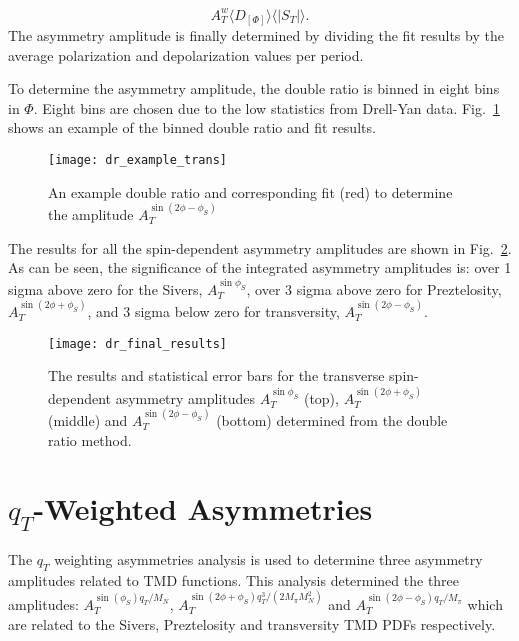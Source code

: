 \begin{equation}
  A^w_T \langle D_{[\Phi]} \rangle \langle |S_T|\rangle.
\end{equation}
\noindent
The asymmetry amplitude is finally determined by dividing the fit results by the
average polarization and depolarization values per period.

To determine the asymmetry amplitude, the double ratio is binned in eight bins
in $\Phi$.  Eight bins are chosen due to the low statistics from Drell-Yan data.
Fig.~\ref{fig::dr_example_trans} shows an example of the binned double ratio and
fit results.

\begin{figure}[h!t]
  \centering \texttt{[image: dr\_example\_trans]}
  \caption{An example double ratio and corresponding fit (red) to determine the
    amplitude $A_T^{\sin(2\phi-\phi_S)}$}
  \label{fig::dr_example_trans}
\end{figure}

\noindent
The results for all the spin-dependent asymmetry amplitudes are shown in
Fig.~\ref{fig::dr_final_results}.  As can be seen, the significance of the
integrated asymmetry amplitudes is: over 1 sigma above zero for the Sivers,
$A^{\sin\phi_S}_T$, over 3 sigma above zero for Preztelosity,
$A^{\sin(2\phi+\phi_S)}_T$, and 3 sigma below zero for transversity,
$A^{\sin(2\phi-\phi_S)}_T$.

\begin{figure}[h!t]
  \centering \texttt{[image: dr\_final\_results]}
  \caption{The results and statistical error bars for the transverse
    spin-dependent asymmetry amplitudes $A^{\sin\phi_S}_T$ (top),
    $A^{\sin(2\phi+\phi_S)}_T$ (middle) and $A^{\sin(2\phi-\phi_S)}_T$ (bottom)
    determined from the double ratio method.}
  \label{fig::dr_final_results}
\end{figure}


\section{$q_T$-Weighted Asymmetries} \label{sec::qtweighted}
The $q_T$ weighting asymmetries analysis is used to determine three asymmetry
amplitudes related to TMD functions.  This analysis determined the three
amplitudes: $A_T^{\sin(\phi_S) q_T/M_N}$, $A_T^{\sin(2\phi+\phi_S)
  q^3_T/(2M_{\pi}M_N^2)}$ and $A_T^{\sin(2\phi-\phi_S) q_T/M_{\pi}}$ which are
related to the Sivers, Preztelosity and transversity TMD PDFs respectively.

